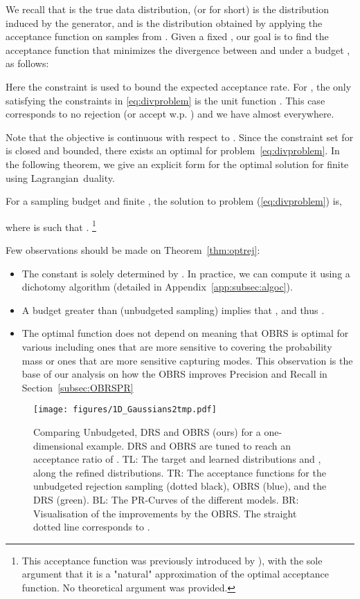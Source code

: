 \documentclass[twoside]{article}
\begin{document}
We recall that  is the true data distribution,  (or  for short) is the distribution induced by the generator, and  is the distribution obtained by applying the acceptance function  on samples from . Given a fixed , our goal is to find the acceptance function  that minimizes the  divergence between  and  under a budget , as follows: 

Here the constraint  is used to bound the expected acceptance rate. For , the only  satisfying the constraints in \eqref{eq:divproblem} is the unit function . This case corresponds to no rejection (or accept w.p. ) and we have  almost everywhere.

Note that the objective  is continuous with respect to . Since the constraint set for  is closed and bounded, there exists an optimal  for problem~\eqref{eq:divproblem}. In the following theorem, we give an explicit form for the optimal solution  for finite  using Lagrangian~duality.



\begin{theorem}\label{thm:optrej}
For a sampling budget  and finite , the solution to problem (\ref{eq:divproblem}) is,

where  is such that .
\footnote{This acceptance function was previously introduced by \cite{grover_variational_2018}), with the sole argument that it is a "natural" approximation of the optimal acceptance function. No theoretical argument was provided.} 
\end{theorem}
Few observations should be made on Theorem~\ref{thm:optrej}:
\begin{itemize}
    \item The constant  is solely determined by . In practice, we can compute it using a dichotomy algorithm (detailed in Appendix~\ref{app:subsec:algoc}).
    \item A budget greater than  (unbudgeted sampling) implies that , and thus . 
    \item The optimal function  does not depend on  meaning that OBRS is optimal for various  \fdivs including ones that are more sensitive to covering the probability mass or ones that are more sensitive capturing modes. This observation is the base of our analysis on how the OBRS improves Precision and Recall in Section~\ref{subsec:OBRSPR}
\end{itemize}

\begin{figure}[t!]
    \centering
    \texttt{[image: figures/1D\_Gaussians2tmp.pdf]}
    \caption{Comparing Unbudgeted, DRS \citep{azadi_discriminator_2019} and OBRS (ours) for a one-dimensional example. DRS and OBRS are tuned to reach an acceptance ratio of . TL: The target and learned distributions  and , along the refined distributions. TR: The acceptance functions for the unbudgeted rejection sampling (dotted black), OBRS (blue), and the DRS (green). BL: The PR-Curves of the different models. BR: Visualisation of the improvements by the OBRS. The straight dotted line corresponds to .
    }
    \label{fig:1D}
\end{figure}
\end{document}
